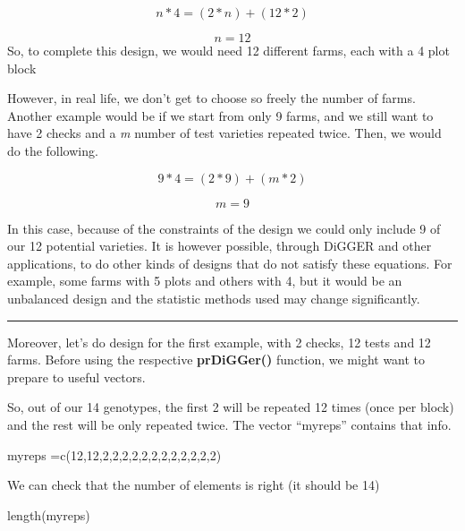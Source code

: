 \documentclass[
]{book}
\newenvironment{Shaded}{\begin{snugshade}}{\end{snugshade}}
\newcommand{\DecValTok}[1]{\textcolor[rgb]{0.00,0.00,0.81}{#1}}
\newcommand{\FunctionTok}[1]{\textcolor[rgb]{0.00,0.00,0.00}{#1}}
\newcommand{\NormalTok}[1]{#1}
\newcommand{\OtherTok}[1]{\textcolor[rgb]{0.56,0.35,0.01}{#1}}
\begin{document}
\[
n*4 = (2*n) + (12*2)
\]

\[
n= 12
\]
So, to complete this design, we would need 12 different farms, each with a 4 plot block

However, in real life, we don't get to choose so freely the number of farms. Another example would be if we start from only 9 farms, and we still want to have 2 checks and a \emph{m} number of test varieties repeated twice. Then, we would do the following.

\[
9*4 = (2*9) + (m*2)
\]

\[
m= 9
\]

In this case, because of the constraints of the design we could only include 9 of our 12 potential varieties. It is however possible, through DiGGER and other applications, to do other kinds of designs that do not satisfy these equations. For example, some farms with 5 plots and others with 4, but it would be an unbalanced design and the statistic methods used may change significantly.

\begin{center}\rule{0.5\linewidth}{0.5pt}\end{center}

Moreover, let's do design for the first example, with 2 checks, 12 tests and 12 farms. Before using the respective \textbf{prDiGGer()} function, we might want to prepare to useful vectors.

So, out of our 14 genotypes, the first 2 will be repeated 12 times (once per block) and the rest will be only repeated twice. The vector ``myreps'' contains that info.

\begin{Shaded}
\begin{Highlighting}[]
\NormalTok{myreps }\OtherTok{=}\FunctionTok{c}\NormalTok{(}\DecValTok{12}\NormalTok{,}\DecValTok{12}\NormalTok{,}\DecValTok{2}\NormalTok{,}\DecValTok{2}\NormalTok{,}\DecValTok{2}\NormalTok{,}\DecValTok{2}\NormalTok{,}\DecValTok{2}\NormalTok{,}\DecValTok{2}\NormalTok{,}\DecValTok{2}\NormalTok{,}\DecValTok{2}\NormalTok{,}\DecValTok{2}\NormalTok{,}\DecValTok{2}\NormalTok{,}\DecValTok{2}\NormalTok{,}\DecValTok{2}\NormalTok{)}
\end{Highlighting}
\end{Shaded}

We can check that the number of elements is right (it should be 14)

\begin{Shaded}
\begin{Highlighting}[]
\FunctionTok{length}\NormalTok{(myreps)}
\end{Highlighting}
\end{Shaded}
\end{document}
